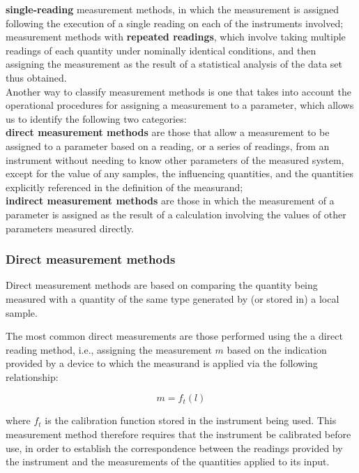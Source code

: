 \documentclass[../main.tex]{subfiles}
\begin{document}
\textbf{single-reading} measurement methods, in which the measurement is assigned following the execution of a single reading on each of the instruments involved;\\

measurement methods with \textbf{repeated readings}, which involve taking multiple readings of each quantity under nominally identical conditions, and then assigning the measurement as the result of a statistical analysis of the data set thus obtained.\\

Another way to classify measurement methods is one that takes into account the operational procedures for assigning a measurement to a parameter, which allows us to identify the following two categories:\\

\textbf{direct measurement methods} are those that allow a measurement to be assigned to a parameter based on  a reading, or a series of readings, from an instrument without needing to know other parameters of the measured system, except for the value of any samples, the influencing quantities, and the quantities explicitly referenced in the definition of the measurand; \\

\textbf{indirect measurement methods} are those in which the measurement of a parameter is assigned as the result of a calculation involving the values of other parameters measured directly.

\subsubsection{Direct measurement methods}
\label{221}

Direct measurement methods are based on comparing the quantity being measured with a quantity of the same type generated by (or stored in) a local sample.

The most common direct measurements are those performed using the a direct reading method, i.e., assigning the measurement $m$ based on the indication provided by a device to which the measurand is applied via the following relationship:


\begin{equation}
	m = f_t(l)
\end{equation}

where $f_t$ is the calibration function stored in the instrument being used.
This measurement method therefore requires that the instrument be calibrated before use, in order to establish the correspondence between the readings provided by the instrument and the measurements of the quantities applied to its input.
\end{document}
